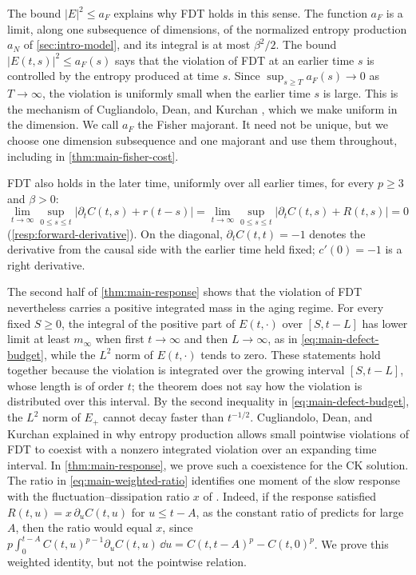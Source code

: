 The bound $|E|^2\le a_F$ explains why FDT holds in this sense. The function $a_F$ is a limit, along one subsequence of dimensions, of the normalized entropy production $a_N$ of \cref{sec:intro-model}, and its integral is at most $\beta^2/2$. The bound $|E(t,s)|^2\le a_F(s)$ says that the violation of FDT at an earlier time $s$ is controlled by the entropy produced at time $s$. Since $\sup_{s\ge T}a_F(s)\to0$ as $T\to\infty$, the violation is uniformly small when the earlier time $s$ is large. This is the mechanism of Cugliandolo, Dean, and Kurchan \cite{cdk1997}, which we make uniform in the dimension. We call $a_F$ the Fisher majorant. It need not be unique, but we choose one dimension subsequence and one majorant and use them throughout, including in \cref{thm:main-fisher-cost}.

FDT also holds in the later time, uniformly over all earlier times, for every $p\ge3$ and $\beta>0$:
\[
 \lim_{t\to\infty}\sup_{0\le s\le t}|\partial_tC(t,s)+r(t-s)|
 =\lim_{t\to\infty}\sup_{0\le s\le t}|\partial_tC(t,s)+R(t,s)|=0
\]
(\cref{resp:forward-derivative}). On the diagonal, $\partial_tC(t,t)=-1$ denotes the derivative from the causal side with the earlier time held fixed; $c'(0)=-1$ is a right derivative.

The second half of \cref{thm:main-response} shows that the violation of FDT nevertheless carries a positive integrated mass in the aging regime. For every fixed $S\ge0$, the integral of the positive part of $E(t,\cdot)$ over $[S,t-L]$ has lower limit at least $m_\infty$ when first $t\to\infty$ and then $L\to\infty$, as in \eqref{eq:main-defect-budget}, while the $L^2$ norm of $E(t,\cdot)$ tends to zero. These statements hold together because the violation is integrated over the growing interval $[S,t-L]$, whose length is of order $t$; the theorem does not say how the violation is distributed over this interval. By the second inequality in \eqref{eq:main-defect-budget}, the $L^2$ norm of $E_+$ cannot decay faster than $t^{-1/2}$. Cugliandolo, Dean, and Kurchan explained in \cite{cdk1997} why entropy production allows small pointwise violations of FDT to coexist with a nonzero integrated violation over an expanding time interval. In \cref{thm:main-response}, we prove such a coexistence for the CK solution. The ratio in \eqref{eq:main-weighted-ratio} identifies one moment of the slow response with the fluctuation--dissipation ratio $x$ of \cite{ck1993}. Indeed, if the response satisfied $R(t,u)=x\,\partial_uC(t,u)$ for $u\le t-A$, as the constant ratio of \cite{ck1993} predicts for large $A$, then the ratio would equal $x$, since $p\int_0^{t-A}C(t,u)^{p-1}\partial_uC(t,u)\,\dd u=C(t,t-A)^p-C(t,0)^p$. We prove this weighted identity, but not the pointwise relation.

